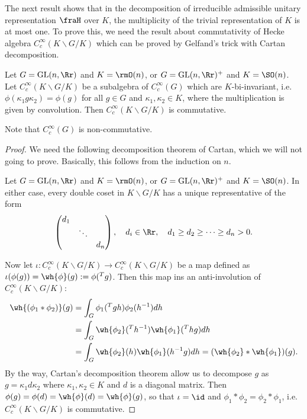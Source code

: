 The next result shows that in the decomposition of irreducible admissible unitary representation $\fraH$ over $K$, the multiplicity of the trivial representation of $K$ is at most one. 
To prove this, we need the result about commutativity of Hecke algebra $C^{\infty}_{c}(K\backslash G/K)$ which can be proved by Gelfand's trick with Cartan decomposition. 

\begin{theorem}[Gelfand]
\label{archec}
Let $G = \GL(n, \Rr)$ and $K = \rmO(n)$, or $G = \GL(n, \Rr)^{+}$ and $K = \SO(n)$. Let $C_{c}^{\infty}(K\backslash G/K)$ be a subalgebra of $C_{c}^{\infty}(G)$ which are $K$-bi-invariant, i.e. $\phi(\kappa_{1}g\kappa_{2})=\phi(g)$ for all $g\in G$ and $\kappa_{1}, \kappa_{2}\in K$, where the multiplication is given by convolution. 
Then $C_{c}^{\infty}(K\backslash G/K)$ is commutative. 
\end{theorem}
Note that $C_{c}^{\infty}(G)$ is non-commutative. 
\begin{proof}
We need the following decomposition theorem of Cartan, which we will not going to prove. Basically, this follows from the induction on $n$. 
\begin{proposition}[Cartan]
Let $G = \GL(n, \Rr)$ and $K = \rmO(n)$, or $G = \GL(n, \Rr)^{+}$ and $K = \SO(n)$. 
In either case, every double coset in $K\backslash G/K$ has a unique representative of the form 
$$
\begin{pmatrix} d_{1} & & \\ & \ddots & \\ & & d_{n}\end{pmatrix}, \quad d_{i}\in \Rr, \quad d_{1} \geq d_{2} \geq \dots \geq d_{n} >0.
$$
\end{proposition}
Now let $\iota:C^{\infty}_{c}(K\backslash G / K)\to C^{\infty}_{c}(K\backslash G /K)$ be a map defined as $\iota(\phi(g))= \wh{\phi}(g) := \phi(\pre{T}{g})$. 
Then this map ins an anti-involution of $C^{\infty}_{c}(K\backslash G / K)$:
\begin{align*}
\wh{(\phi_{1}*\phi_{2})}(g) &= \int_{G} \phi_{1}(\pre{T}{}gh)\phi_{2}(h^{-1})dh \\
&= \int_{G} \wh{\phi_{2}}({}^{T}h^{-1}) \wh{\phi_{1}}({}^{T}hg) dh \\
&= \int_{G} \wh{\phi_{2}}(h) \wh{\phi_{1}}(h^{-1}g)dh = (\wh{\phi_{2}} * \wh{\phi_{1}})(g). 
\end{align*}
By the way, Cartan's decomposition theorem allow us to decompose $g$ as $g = \kappa_{1} d\kappa_{2}$ where $\kappa_{1}, \kappa_{2}\in K$ and $d$ is a diagonal matrix. Then 
$\phi(g) = \phi(d) = \wh{\phi}(d) = \wh{\phi}(g)$, so that $\iota = \id$ and $\phi_{1} * \phi_{2} = \phi_{2} * \phi_{1}$, i.e. $C_{c}^{\infty}(K\backslash G /K)$ is commutative. 
\end{proof}

